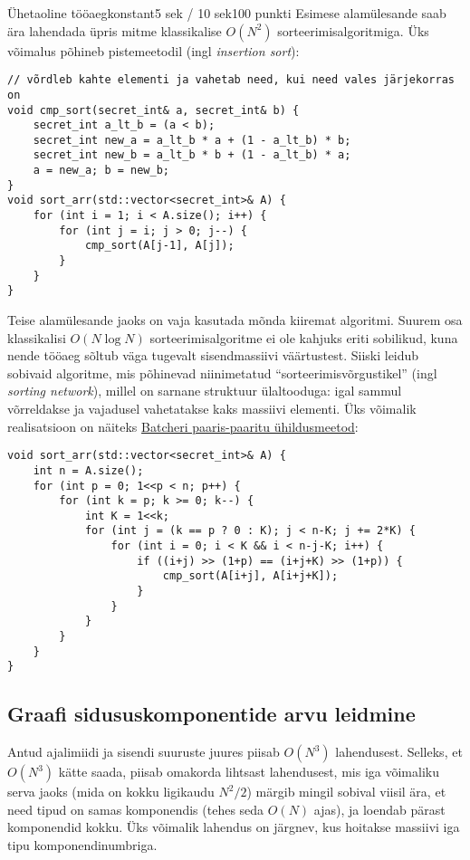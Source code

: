 \begin{yl}{7}{Ühetaoline tööaeg}{konstant}{5 sek / 10 sek}{100 punkti}
  Esimese alamülesande saab ära lahendada üpris mitme klassikalise $O(N^2)$ sorteerimisalgoritmiga. Üks võimalus põhineb pistemeetodil (ingl \textit{insertion sort}):

  \begin{lstlisting}
// võrdleb kahte elementi ja vahetab need, kui need vales järjekorras on
void cmp_sort(secret_int& a, secret_int& b) {
    secret_int a_lt_b = (a < b);
    secret_int new_a = a_lt_b * a + (1 - a_lt_b) * b;
    secret_int new_b = a_lt_b * b + (1 - a_lt_b) * a;
    a = new_a; b = new_b;
}
void sort_arr(std::vector<secret_int>& A) {
    for (int i = 1; i < A.size(); i++) {
        for (int j = i; j > 0; j--) {
            cmp_sort(A[j-1], A[j]);
        }
    }
}
  \end{lstlisting}

  Teise alamülesande jaoks on vaja kasutada mõnda kiiremat algoritmi. Suurem osa klassikalisi $O(N \log N)$ sorteerimisalgoritme ei ole kahjuks eriti sobilikud, kuna nende tööaeg sõltub väga tugevalt sisendmassiivi väärtustest. Siiski leidub sobivaid algoritme, mis põhinevad niinimetatud ``sorteerimisvõrgustikel'' (ingl \textit{sorting network}), millel on sarnane struktuur ülaltooduga: igal sammul võrreldakse ja vajadusel vahetatakse kaks massiivi elementi. Üks võimalik realisatsioon on näiteks \href{https://en.wikipedia.org/wiki/Batcher_odd%E2%80%93even_mergesort}{Batcheri paaris-paaritu ühildusmeetod}:

  \begin{lstlisting}
void sort_arr(std::vector<secret_int>& A) {
    int n = A.size();
    for (int p = 0; 1<<p < n; p++) {
        for (int k = p; k >= 0; k--) {
            int K = 1<<k;
            for (int j = (k == p ? 0 : K); j < n-K; j += 2*K) {
                for (int i = 0; i < K && i < n-j-K; i++) {
                    if ((i+j) >> (1+p) == (i+j+K) >> (1+p)) {
                        cmp_sort(A[i+j], A[i+j+K]);
                    }
                }
            }
        }
    }
}
  \end{lstlisting}

  \subsection*{Graafi sidususkomponentide arvu leidmine}

  Antud ajalimiidi ja sisendi suuruste juures piisab $O(N^3)$ lahendusest. Selleks, et $O(N^3)$ kätte saada, piisab omakorda lihtsast lahendusest, mis iga võimaliku serva jaoks (mida on kokku ligikaudu $N^2/2$) märgib mingil sobival viisil ära, et need tipud on samas komponendis (tehes seda $O(N)$ ajas), ja loendab pärast komponendid kokku. Üks võimalik lahendus on järgnev, kus hoitakse massiivi iga tipu komponendinumbriga.


\end{yl}
